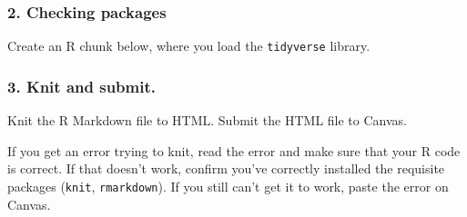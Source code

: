 \documentclass[]{book}
\begin{document}
\subsubsection*{2. Checking packages}\label{checking-packages}

Create an R chunk below, where you load the \texttt{tidyverse} library.

\subsubsection*{3. Knit and submit.}\label{knit-and-submit.}

Knit the R Markdown file to HTML. Submit the HTML file to Canvas.

If you get an error trying to knit, read the error and make sure that
your R code is correct. If that doesn't work, confirm you've correctly
installed the requisite packages (\texttt{knit}, \texttt{rmarkdown}). If
you still can't get it to work, paste the error on Canvas.


\end{document}
